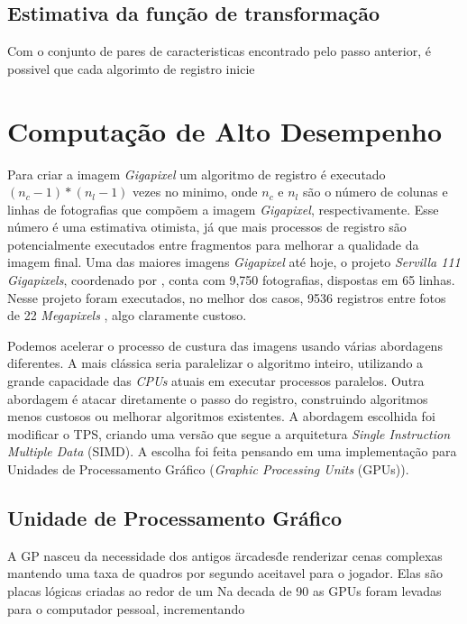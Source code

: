 \subsection{Estimativa da função de transformação}
    
    Com o conjunto de pares de caracteristicas encontrado pelo passo anterior, é possivel que cada algorimto de registro
inicie 

\section{Computação de Alto Desempenho}
    Para criar a imagem \textit{Gigapixel} um algoritmo de registro é executado $(n_c-1)*(n_l-1)$ vezes no minimo, 
onde $n_c$ e $n_l$ são o número de colunas e linhas de fotografias que compõem a imagem \textit{Gigapixel}, 
respectivamente. Esse número é uma estimativa otimista, já que mais processos de registro são potencialmente executados
entre fragmentos para melhorar a qualidade da imagem final. Uma das maiores imagens \textit{Gigapixel} até hoje, 
o projeto \textit{Servilla 111 Gigapixels}, coordenado por \cite{sevilla111},  conta com 9,750 fotografias, dispostas
em 65 linhas. Nesse projeto foram executados, no melhor dos casos, 9536 registros entre fotos de 22 \textit{Megapixels}
, algo claramente custoso.

    Podemos acelerar o processo de custura das imagens usando várias abordagens diferentes. A mais clássica seria
paralelizar o algoritmo inteiro, utilizando a grande capacidade das \textit{CPUs} atuais em executar processos paralelos.
Outra abordagem é atacar diretamente o passo do registro, construindo algoritmos menos custosos ou melhorar algoritmos
existentes. A abordagem escolhida foi modificar o TPS, criando uma versão que segue a arquitetura 
\textit{Single Instruction Multiple Data} (SIMD). A escolha foi feita pensando em uma implementação para 
Unidades de Processamento Gráfico (\textit{Graphic Processing Units} (GPUs)).

\subsection{Unidade de Processamento Gráfico}
    A GP nasceu da necessidade dos antigos \"arcades\" de renderizar cenas complexas mantendo uma taxa de quadros por 
segundo aceitavel para o jogador. Elas são placas lógicas criadas ao redor de um Na decada de 90 as GPUs foram levadas para o computador pessoal, incrementando 

